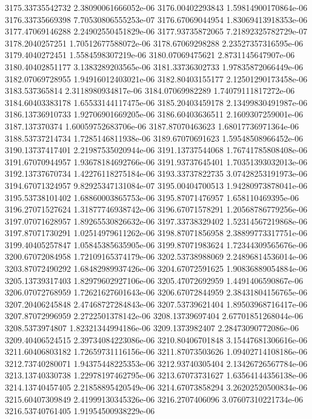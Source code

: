 {3175.33735542732 2.38090061666052e-06
3176.00402293843 1.59814900170864e-06
3176.33735669398 7.70530806555253e-07
3176.67069044954 1.83069413918353e-06
3177.47069146288 2.24902550451829e-06
3177.93735872065 7.21892325782729e-07
3178.2040257251 1.70512677588072e-06
3178.67069298288 2.23527357316595e-06
3179.4040272451 1.5584598307219e-06
3180.07069475621 2.8731145647907e-06
3180.40402851177 3.1383289203565e-06
3181.33736302733 1.97835872066449e-06
3182.07069728955 1.94916012403021e-06
3182.80403155177 2.12501290173458e-06
3183.537365814 2.3118980934817e-06
3184.07069982289 1.74079111817272e-06
3184.60403383178 1.65533144117475e-06
3185.20403459178 2.13499830491987e-06
3186.13736910733 1.92706901669205e-06
3186.60403636511 2.1609307259001e-06
3187.137370374 1.60059752683706e-06
3187.87070463623 1.68017736971364e-06
3188.53737214734 1.7285146811938e-06
3189.67070691623 1.59548508966452e-06
3190.13737417401 2.21987535020944e-06
3191.13737544068 1.76741785808408e-06
3191.67070944957 1.93678184692766e-06
3191.93737645401 1.70351393032013e-06
3192.13737670734 1.42276118275184e-06
3193.33737822735 3.07428253191973e-06
3194.67071324957 9.82925347131084e-07
3195.00404700513 1.94280973878041e-06
3195.53738101402 1.68860003865753e-06
3195.87071476957 1.658110469395e-06
3196.27071527624 1.31877746938742e-06
3196.67071578291 1.20568786779256e-06
3197.07071628957 1.89265530826632e-06
3197.33738329402 1.52314567219868e-06
3197.87071730291 1.02514979611262e-06
3198.87071856958 2.38899773317751e-06
3199.40405257847 1.05845385635905e-06
3199.87071983624 1.72344309565676e-06
3200.67072084958 1.72109165374179e-06
3202.53738988069 2.24896814536014e-06
3203.87072490292 1.68482989937426e-06
3204.67072591625 1.90836889054884e-06
3205.13739317403 1.82979602927106e-06
3205.47072692959 1.4491406590867e-06
3206.07072768959 1.72621627601643e-06
3206.67072844959 2.38431804156765e-06
3207.20406245848 2.47468727284843e-06
3207.53739621404 1.89503968716417e-06
3207.87072996959 2.2722501378142e-06
3208.13739697404 2.67701851268044e-06
3208.5373974807 1.82321344994186e-06
3209.1373982407 2.28473090772086e-06
3209.40406524515 2.39734084223086e-06
3210.80406701848 3.15447681306616e-06
3211.60406803182 1.72659731116156e-06
3211.87073503626 1.09402714108186e-06
3212.73740280071 1.94375448225353e-06
3212.93740305404 2.13426726567784e-06
3213.13740330738 1.22978197462795e-06
3213.67073731627 1.63564144356138e-06
3214.13740457405 2.21858895420549e-06
3214.67073858294 3.26202520500834e-06
3215.60407309849 2.41999130345326e-06
3216.2707406096 3.07607310221734e-06
3216.53740761405 1.91954500938229e-06
}
